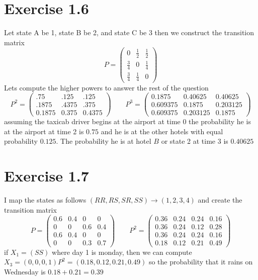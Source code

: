 \documentclass[11pt]{article}
\begin{document}
\section{Exercise 1.6}
Let state A be 1, state B be 2, and state C be 3 then we construct the transition matrix
\[
P =
\begin{pmatrix} 0 & \frac{1}{2} & \frac{1}{2} \\
    \frac{3}{4} & 0 & \frac{1}{4}\\
    \frac{3}{4} & \frac{1}{4} & 0
\end{pmatrix} 
\] 
Lets compute the higher powers to answer the rest of the question
\[
    P^{2} = \begin{pmatrix}
.75 & .125 & .125\\
.1875 & .4375 & .375\\
0.1875 & 0.375 & 0.4375
\end{pmatrix}
\qquad P^{3} =
\begin{pmatrix} 0.1875 & 0.40625 & 0.40625\\
    0.609375 & 0.1875 & 0.203125\\
    0.609375 & 0.203125 & 0.1875
\end{pmatrix} 
\] 
assuming the taxicab driver begins at the airport at time 0 the probability he is at the airport at time 2 
is $0.75$ and he is at the other hotels with equal probability  $0.125$. The probability he is at
hotel  $B$ or state 2 at time $3$ is $0.40625$

\section{Exercise 1.7}
I map the states as follows  $(RR,RS,SR,SS) \rightarrow (1,2,3,4)$ and create the transition matrix
\[
P =
\begin{pmatrix} 0.6 & 0.4 & 0 & 0\\
    0 & 0 & 0.6 & 0.4\\
    0.6 & 0.4 & 0 & 0\\
    0 & 0 & 0.3 & 0.7
\end{pmatrix} 
\qquad P^2 =
\begin{pmatrix} 
    0.36 & 0.24 & 0.24 & 0.16\\
    0.36 & 0.24 & 0.12 & 0.28\\
    0.36 & 0.24 & 0.24 & 0.16\\
    0.18 & 0.12 & 0.21 & 0.49
\end{pmatrix} 
\] 
if $X_1 = (SS)$ where day 1 is monday, then we can compute $X_3 = (0,0,0,1) P^2 = (0.18,0.12,0.21,0.49)$ so the probability that it rains on
Wednesday is $0.18 + 0.21 = 0.39$
\end{document}

